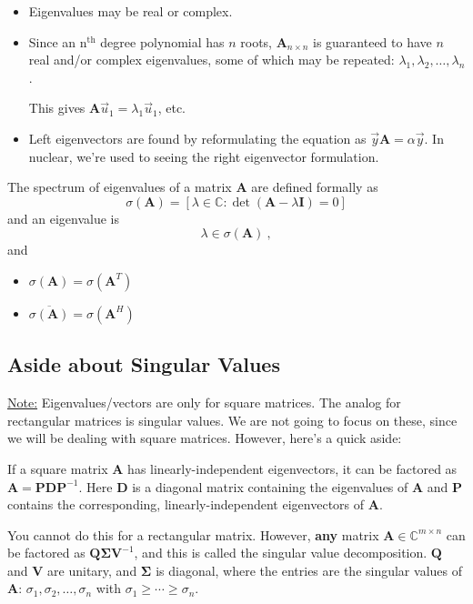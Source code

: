 \documentclass[12pt]{article}
\newcommand{\nth}{n\ensuremath{^{\text{th}}} }
\newcommand{\ve}[1]{\ensuremath{\mathbf{#1}}}
\newcommand{\cc}[1]{\ensuremath{\overline{#1}}}
\begin{document}
\begin{itemize}
\item Eigenvalues may be real or complex. 

\item Since an \nth degree polynomial has $n$ roots, $\ve{A}_{n \times n}$ is guaranteed to have $n$ real and/or complex eigenvalues, some of which may be repeated: $\lambda_1, \lambda_2, \dots, \lambda_n$.

This gives $\ve{A}\vec{u}_1 = \lambda_1 \vec{u}_1$, etc.

\item Left eigenvectors are found by reformulating the equation as $\vec{y}\ve{A} = \alpha \vec{y}$. In nuclear, we're used to seeing the right eigenvector formulation.
\end{itemize}


The spectrum of eigenvalues of a matrix $\ve{A}$ are defined formally as
\[\sigma(\ve{A}) = [ \lambda \in \mathbb{C} : \det(\ve{A} - \lambda \ve{I})=0] \] 
and an eigenvalue is 
\[ \lambda \in \sigma(\ve{A})\:,\]
and
\begin{itemize}
\item $\sigma(\ve{A}) = \sigma(\ve{A}^T)$
\item $\cc{\sigma(\ve{A})} = \sigma(\ve{A}^H)$
\end{itemize}

\subsection*{Aside about Singular Values}

\underline{Note:} Eigenvalues/vectors are only for square matrices. The analog for rectangular matrices is singular values. We are not going to focus on these, since we will be dealing with square matrices. However, here's a quick aside:

If a square matrix $\ve{A}$ has linearly-independent eigenvectors, it can be factored as $\ve{A} = \ve{P}\ve{D}\ve{P}^{-1}$. Here $\ve{D}$ is a diagonal matrix containing the eigenvalues of $\ve{A}$ and $\ve{P}$ contains the corresponding, linearly-independent eigenvectors of $\ve{A}$.  

You cannot do this for a rectangular matrix. However, \textbf{any} matrix $\ve{A} \in \mathbb{C}^{m \times n}$ can be factored as $\ve{Q}\ve{\Sigma}\ve{V}^{-1}$, and this is called the singular value decomposition. $\ve{Q}$ and $\ve{V}$ are unitary, and $\ve{\Sigma}$ is diagonal, where the entries are the singular values of $\ve{A}$: $\sigma_1, \sigma_2, \dots, \sigma_n$ with $\sigma_1 \geq \cdots \geq \sigma_n$. 
\end{document}
